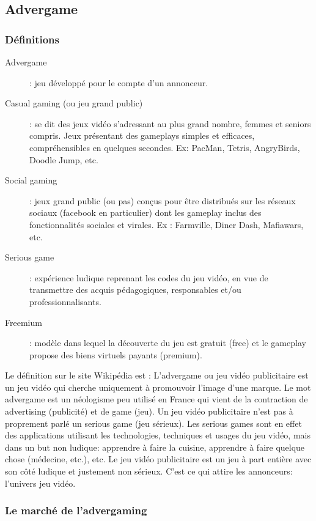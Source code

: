 
\subsection{Advergame} %
\label{sub:advergame}

\subsubsection{Définitions} %
\label{ssub:définitions}

\begin{description}
	\item[Advergame] : jeu développé pour le compte d’un annonceur.
	\item[Casual gaming (ou jeu grand public)] : se dit des jeux vidéo s'adressant au plus grand nombre, femmes et seniors compris. Jeux présentant des gameplays simples et efficaces, compréhensibles en quelques secondes. Ex: PacMan, Tetris, AngryBirds, Doodle Jump, etc.
	\item[Social gaming] : jeux grand public (ou pas) conçus pour être distribués sur les réseaux sociaux (facebook en particulier) dont les gameplay inclus des fonctionnalités sociales et virales. Ex : Farmville, Diner Dash, Mafiawars, etc.
	\item[Serious game] : expérience ludique reprenant les codes du jeu vidéo, en vue de transmettre des acquis pédagogiques, responsables et/ou professionnalisants.
	\item[Freemium] : modèle dans lequel la découverte du jeu est gratuit (free) et le gameplay propose des biens virtuels payants (premium).
\end{description}
Le définition sur le site Wikipédia est : L'advergame ou jeu vidéo publicitaire est un jeu vidéo qui cherche uniquement à promouvoir l'image d'une marque. Le mot advergame est un néologisme peu utilisé en France qui vient de la contraction de advertising (publicité) et de game (jeu). Un jeu vidéo publicitaire n'est pas à proprement parlé un serious game (jeu sérieux). Les serious games sont en effet des applications utilisant les technologies, techniques et usages du jeu vidéo, mais dans un but non ludique: apprendre à faire la cuisine, apprendre à faire quelque chose (médecine, etc.), etc.
Le jeu vidéo publicitaire est un jeu à part entière avec son côté ludique et justement non sérieux. C'est ce qui attire les annonceurs: l'univers jeu vidéo.


\subsubsection{Le marché de l'advergaming} %
\label{ssub:le_marché_de_l_advergame}

